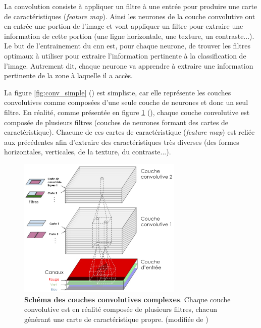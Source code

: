 La convolution consiste à appliquer un filtre à une entrée pour produire une carte de caractéristiques (\textit{feature map}). Ainsi les neurones de la couche convolutive ont en entrée une portion de l'image et vont appliquer un filtre pour extraire une information de cette portion (une ligne horizontale, une texture, un contraste...). Le but de l'entrainement du \gls{cnn} est, pour chaque neurone, de trouver les filtres optimaux à utiliser pour extraire l'information pertinente à la classification de l'image. Autrement dit, chaque neurone va apprendre à extraire une information pertinente de la zone à laquelle il a accès.


La figure \ref{fig:conv_simple} (\cite{aurelien_geron_hands-machine_2019}) est simpliste, car elle représente les couches convolutives comme composées d'une seule couche de neurones et donc un seul filtre. En réalité, comme présentée en figure \ref{fig:conv_complex} (\cite{aurelien_geron_hands-machine_2019}), chaque couche convolutive est composée de plusieurs filtres (couches de neurones formant des cartes de caractéristique). Chacune de ces cartes de caractéristique (\textit{feature map}) est reliée aux précédentes afin d'extraire des caractéristiques très diverses (des formes horizontales, verticales, de la texture, du contraste...).
\begin{figure}[!htbp]
 \centering
 \includegraphics[width=0.7\textwidth]{figures/conv_complex.png}
 \caption[Schéma des couches convolutives]{\textbf{Schéma des couches convolutives complexes}. Chaque couche convolutive est en réalité composée de plusieurs filtres, chacun générant une carte de caractéristique propre. (modifiée de \cite{aurelien_geron_hands-machine_2019})}
 \label{fig:conv_complex}
\end{figure}


